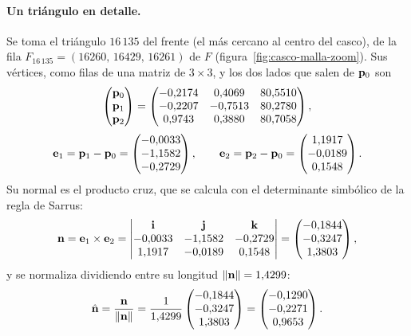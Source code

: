 \paragraph{Un triángulo en detalle.} Se toma el triángulo $16\,135$ del frente (el más cercano al centro del casco), de la fila $F_{16\,135}=( 16260,\,16429,\,16261 )$ de $F$
(figura~\ref{fig:casco-malla-zoom}). Sus vértices, como filas de una matriz de $3\times3$, y los dos lados que salen de $\mathbf{p}_0$ son
\begin{equation}
\begin{pmatrix}\mathbf{p}_0\\\mathbf{p}_1\\\mathbf{p}_2\end{pmatrix}=\begin{pmatrix} -0{,}2174 & 0{,}4069 & 80{,}5510 \\ -0{,}2207 & -0{,}7513 & 80{,}2780 \\ 0{,}9743 & 0{,}3880 & 80{,}7058 \end{pmatrix},
\end{equation}
\begin{equation}
\mathbf{e}_1=\mathbf{p}_1-\mathbf{p}_0=\begin{pmatrix} -0{,}0033 \\ -1{,}1582 \\ -0{,}2729 \end{pmatrix},\qquad \mathbf{e}_2=\mathbf{p}_2-\mathbf{p}_0=\begin{pmatrix} 1{,}1917 \\ -0{,}0189 \\ 0{,}1548 \end{pmatrix} .
\end{equation}
Su normal es el producto cruz, que se calcula con el determinante simbólico de la regla de Sarrus:
\begin{equation}
\mathbf{n}=\mathbf{e}_1\times\mathbf{e}_2=\begin{vmatrix}\mathbf{i}&\mathbf{j}&\mathbf{k}\\ -0{,}0033&-1{,}1582&-0{,}2729\\ 1{,}1917&-0{,}0189&0{,}1548\end{vmatrix}=\begin{pmatrix} -0{,}1844 \\ -0{,}3247 \\ 1{,}3803 \end{pmatrix},
\end{equation}
y se normaliza dividiendo entre su longitud $\lVert\mathbf{n}\rVert=1{,}4299$:
\begin{equation}
\hat{\mathbf{n}}=\frac{\mathbf{n}}{\lVert\mathbf{n}\rVert}=\frac{1}{1{,}4299}\begin{pmatrix} -0{,}1844 \\ -0{,}3247 \\ 1{,}3803 \end{pmatrix}=\begin{pmatrix} -0{,}1290 \\ -0{,}2271 \\ 0{,}9653 \end{pmatrix} .
\end{equation}

